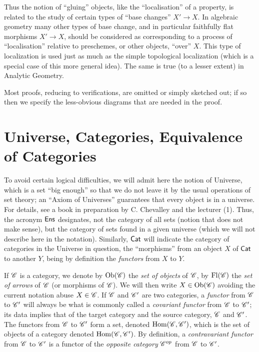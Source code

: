 Thus the notion of ``gluing'' objects, like the ``localisation'' of a property, is related to the study of certain types of ``base changes'' $X '\to X$. 
In algebraic geometry many other types of base change, and in particular faithfully flat morphisms $X '\to X$, should be considered as corresponding to a process of ``localisation'' relative to preschemes, or other objects, ``over'' $X$.
This type of localization is used just as much as the simple topological localization (which is a special case of this more general idea). 
The same is true (to a lesser extent) in Analytic Geometry. 

Most proofs, reducing to verifications, are omitted or simply sketched out; if so then we specify the less-obvious diagrams that are needed in the proof.


\section{Universe, Categories, Equivalence of Categories}

To avoid certain logical difficulties, we will admit here the notion of Universe, which is a set ``big enough'' so that we do not leave it by the usual operations of set theory; an ``Axiom of Universes'' guarantees that every object is in a universe. 
For details, see a book in preparation by C. Chevalley and the lecturer (1). 
Thus, the acronym $\mathsf{Ens}$ designates, not the category of all sets (notion that does not make sense), but the category of sets found in a given universe (which we will not describe here in the notation). 
Similarly, $\mathsf{Cat}$ will indicate the category of categories in the Universe in question,
the ``morphisms'' from an object $X$ of $\mathsf{Cat}$ to another $Y$, being by definition the \emph{functors} from $X$ to $Y$.

If $\mathscr{C}$ is a category, we denote by $\mathrm{Ob} (\mathscr{C})$ the \emph{set of objects} of $\mathscr{C}$, by $\mathrm{Fl} (\mathscr{C})$ the \emph{set of arrows} of $\mathscr{C}$ (or morphisms of $\mathscr{C}$). 
We will then write $X \in \mathrm{Ob} (\mathscr{C})$ avoiding the current notation abuse $X \in \mathscr{C}$. 
If $\mathscr{C}$ and $\mathscr{C}'$ are two categories, a \emph{functor} from $\mathscr{C}$ to $\mathscr{C}'$ will always be what is commonly called a \emph{covariant functor} from $\mathscr{C}$ to $\mathscr{C}'$; its data implies that of the target category and the source category, $\mathscr{C}$ and $\mathscr{C}'$. The functors from $\mathscr{C}$ to $\mathscr{C}'$ form a set, denoted $\mathrm{Hom} (\mathscr{C}, \mathscr{C}')$, which is the set of objects of a category denoted $\mathrm{Hom} (\mathscr{C}, \mathscr{C}')$.
By definition, a \emph{contravariant functor} from $\mathscr{C}$ to $\mathscr{C}'$ is a functor of the \emph{opposite category} $\mathscr{C}^{op}$ from $\mathscr{C}$ to $\mathscr{C}'$.

